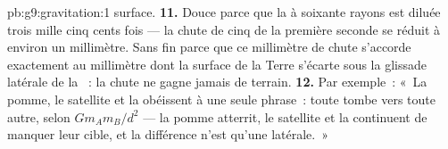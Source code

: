 \begin{solution}{pb:g9:gravitation:1}
surface.
\textbf{11.} Douce parce que la  à soixante rayons est
diluée trois mille cinq cents fois --- la chute de cinq  de la
première seconde se réduit à environ un millimètre. Sans fin parce que
ce millimètre de chute s'accorde exactement au millimètre dont la
surface de la Terre s'écarte sous la glissade latérale de la ~: la
chute ne gagne jamais de terrain.
\textbf{12.} Par exemple~: «~La pomme, le satellite et la 
obéissent à une seule phrase~: toute  tombe vers toute autre,
selon $G m_A m_B / d^2$ --- la pomme atterrit, le satellite et la 
continuent de manquer leur cible, et la différence n'est qu'une
 latérale.~»
\end{solution}
